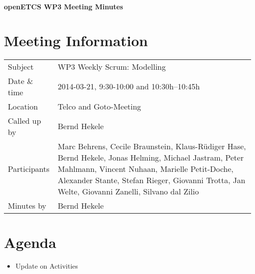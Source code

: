 \documentclass[a4paper, 11pt]{article}
\begin{document}
{\begin{center}\huge\bf openETCS WP3 Meeting Minutes\end{center}}
\section{Meeting Information}

\renewcommand{\arraystretch}{1.5}
\begin{supertabular}{m{.2\textwidth}m{.8\textwidth}}
Subject & WP3 Weekly Scrum: Modelling\\
Date \& time & 2014-03-21, 9:30-10:00 and 10:30h--10:45h\\
Location & Telco and Goto-Meeting\\
Called up by & Bernd Hekele\\
Participants &
Marc Behrens,
Cecile Braunstein,
Klaus-R\"udiger Hase,
Bernd Hekele,
Jonas Helming,
Michael Jastram,
Peter Mahlmann,
Vincent Nuhaan,
Marielle Petit-Doche,
Alexander Stante,
Stefan Rieger,
Giovanni Trotta,
Jan Welte,
Giovanni Zanelli,
Silvano dal Zilio
\\

Minutes by & Bernd Hekele\\
\end{supertabular}
\renewcommand{\arraystretch}{1.0}


\section{{Agenda}}
\begin{itemize}
\item Update on Activities
\end{itemize}
\end{document}
